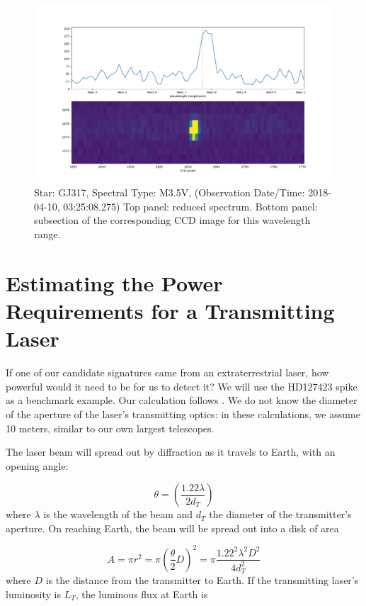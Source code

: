 \documentclass[twocolumn]{aastex701}
\begin{document}
\begin{figure}
    \centering  \includegraphics[width=\textwidth]{2_ADP.2018-04-11T01_01_47.531_zoom (2).png}
    \caption{Star: GJ317, Spectral Type: M3.5V, (Observation Date/Time: 2018-04-10, 03:25:08.275) Top panel: reduced spectrum. Bottom panel: subsection of the corresponding CCD image for this wavelength range.}
    \label{fig:seti_candidate_GJ317}
\end{figure}

\section{Estimating the Power Requirements for a Transmitting Laser}
If one of our candidate signatures came from an extraterrestrial laser, how powerful would it need to be for us to detect it?  We will use the HD127423 spike as a benchmark example.  Our calculation follows \cite{Lipman_2019}.  We do not know the diameter of the aperture of the laser's transmitting optics: in these calculations, we assume 10 meters, similar to our own largest telescopes.

The laser beam will spread out by diffraction as it travels to Earth, with an opening angle:

\begin{equation}
    \theta = (\frac{1.22\lambda}{2d_T})
\end{equation}
where $\lambda$ is the wavelength of the beam and $d_T$ the diameter of the transmitter's aperture.  On reaching Earth, the beam will be spread out into a disk of area

\begin{equation}
    A = \pi r^2 = \pi (\frac{\theta}{2} D)^2 = \pi \frac{1.22^2 \lambda^2 D^2}{4 d_T^2}
\end{equation}
where $D$ is the distance from the transmitter to Earth.  If the transmitting laser's luminosity is $L_T$, the luminous flux at Earth is
\end{document}
